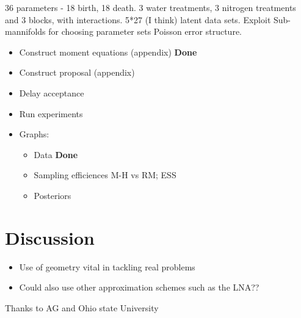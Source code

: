 \documentclass{pnastwo}
\begin{document}
\begin{article}
36 parameters - 18 birth, 18 death. 3 water treatments, 3 nitrogen treatments
and 3 blocks, with interactions. 5*27 (I think) latent data sets. Exploit Sub-mannifolds for choosing parameter sets
Poisson error structure. 


    \begin{itemize}
    \item Construct moment equations (appendix) \textbf{Done}
    \item Construct proposal (appendix)
    \item Delay acceptance
    \item Run experiments
    \item Graphs:
      \begin{itemize}
      \item Data \textbf{Done}
      \item Sampling efficiences M-H vs RM; ESS
      \item Posteriors
      \end{itemize}
    \end{itemize}
    
\section{Discussion}

\begin{itemize}
\item Use of geometry vital in tackling real problems
\item Could also use other approximation schemes such as the LNA??
\end{itemize}






\begin{acknowledgments}
Thanks to AG and Ohio state University
\end{acknowledgments}



\end{article}
\end{document}
